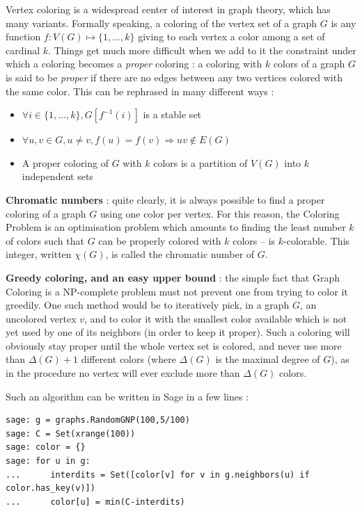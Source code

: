 Vertex coloring is a widespread center of interest in graph theory,
which has many variants. Formally speaking, a coloring of the vertex
set of a graph $G$ is any function $f:V(G) \mapsto \{1,\dots,k\}$ giving to each vertex a color among a set of cardinal $k$. Things get much more difficult when we add to it the constraint under which a coloring becomes a {\it proper} coloring : a coloring with $k$ colors of a graph $G$ is said to be {\it proper} if there are no edges between any two vertices colored with the same color. This can be rephrased in many different ways :
\begin{itemize}
\item $\forall i\in \{1,\dots,k\}, G[f^{-1}(i)]$ is a stable set
\item $\forall u,v\in G,u\neq v, f(u)=f(v)\Rightarrow uv\not \in E(G)$
\item A proper coloring of $G$ with $k$ colors is a partition of $V(G)$ into $k$ independent sets
\end{itemize}

{\bf Chromatic numbers} : quite clearly, it is always possible to find a proper coloring of a graph $G$ using one color per vertex. For this reason, the Coloring Problem is an optimisation problem which amounts to finding the least number $k$ of colors such that $G$ can be properly colored with $k$ colors -- is $k$-colorable. This integer, written $\chi(G)$, is called the chromatic number of $G$.

{\bf Greedy coloring, and an easy upper bound} : the simple fact that Graph Coloring is a NP-complete problem must not prevent one from trying to color it greedily. One such method would be to iteratively pick, in a graph $G$, an uncolored vertex $v$, and to color it with the smallest color available which is not yet used by one of its neighbors (in order to keep it proper). Such a coloring will obviously stay proper until the whole vertex set is colored, and never use more than $\Delta(G)+1$ different colors (where $\Delta(G)$ is the maximal degree of $G$), as in the procedure no vertex will ever exclude more than $\Delta(G)$ colors.

Such an algorithm can be written in Sage in a few lines :

\begin{lstlisting}
sage: g = graphs.RandomGNP(100,5/100)
sage: C = Set(xrange(100))
sage: color = {}
sage: for u in g:
...      interdits = Set([color[v] for v in g.neighbors(u) if color.has_key(v)])
...      color[u] = min(C-interdits)
\end{lstlisting}

